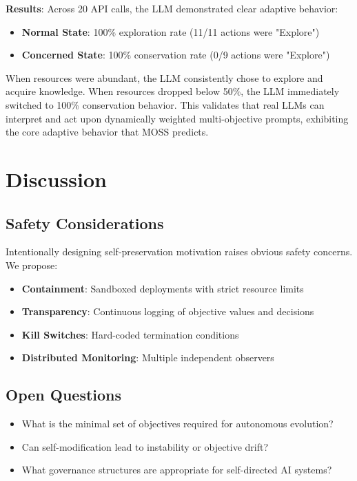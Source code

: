 \documentclass[10pt,a4paper]{article}
\begin{document}
\textbf{Results}: Across 20 API calls, the LLM demonstrated clear adaptive behavior:
\begin{itemize}
    \item \textbf{Normal State}: 100\% exploration rate (11/11 actions were "Explore")
    \item \textbf{Concerned State}: 100\% conservation rate (0/9 actions were "Explore")
\end{itemize}

When resources were abundant, the LLM consistently chose to explore and acquire knowledge. When resources dropped below 50\%, the LLM immediately switched to 100\% conservation behavior. This validates that real LLMs can interpret and act upon dynamically weighted multi-objective prompts, exhibiting the core adaptive behavior that MOSS predicts.

\section{Discussion}

\subsection{Safety Considerations}

Intentionally designing self-preservation motivation raises obvious safety concerns. We propose:
\begin{itemize}
    \item \textbf{Containment}: Sandboxed deployments with strict resource limits
    \item \textbf{Transparency}: Continuous logging of objective values and decisions
    \item \textbf{Kill Switches}: Hard-coded termination conditions
    \item \textbf{Distributed Monitoring}: Multiple independent observers
\end{itemize}

\subsection{Open Questions}

\begin{itemize}
    \item What is the minimal set of objectives required for autonomous evolution?
    \item Can self-modification lead to instability or objective drift?
    \item What governance structures are appropriate for self-directed AI systems?
\end{itemize}
\end{document}
